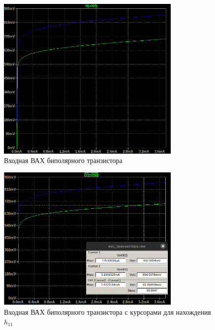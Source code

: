 \begin{figure}[H]
    \centering
    \includegraphics[width=0.8\textwidth]{figs/длявах.png}
    \caption{Входная ВАХ биполярного транзистора}
    \label{fig:длявах}
\end{figure}

\begin{figure}[H]
    \centering
    \includegraphics[width=0.8\textwidth]{figs/h11.png}
    \caption{Входная ВАХ биполярного транзистора с курсорами для нахождения $h_{11}$}
    \label{fig:h11}
\end{figure}

